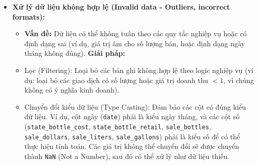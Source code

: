\begin{itemize}
\begin{itemize}
                \item \textbf{Giải pháp:}
                    \item Điền giá trị mặc định: Đối với các trường như địa chỉ, bạn có thể điền "Unknown" (Không xác định) thay vì để trống.
                    \item Xóa bỏ bản ghi: Nếu một số cột quan trọng (ví dụ: các cột liên quan đến doanh số như \texttt{state\_bottle\_cost}, \texttt{state\_bottle\_retail}, \texttt{sale\_bottles}, \texttt{sale\_dollars}, \texttt{sale\_liters}, \texttt{sale\_gallons}) bị thiếu, và việc điền dữ liệu không khả thi hoặc có thể làm sai lệch kết quả, chúng ta có thể xóa các bản ghi đó.
            \end{itemize}
        \item \textbf{Xử lý dữ liệu không hợp lệ (Invalid data - Outliers, incorrect formats):}
            \begin{itemize}
                \item \textbf{Vấn đề:} Dữ liệu có thể không tuân theo các quy tắc nghiệp vụ hoặc có định dạng sai (ví dụ, giá trị âm cho số lượng bán, hoặc định dạng ngày tháng không đúng).
                \textbf{Giải pháp:}
                    \item Lọc (Filtering): Loại bỏ các bản ghi không hợp lệ theo logic nghiệp vụ (ví dụ: loại bỏ các giao dịch có số lượng hoặc giá trị doanh thu $< 1$, vì chúng không có ý nghĩa kinh doanh).
                    \item Chuyển đổi kiểu dữ liệu (Type Casting): Đảm bảo các cột có đúng kiểu dữ liệu. Ví dụ, cột ngày (\texttt{date}) phải là kiểu ngày tháng, và các cột số (\texttt{state\_bottle\_cost}, \texttt{state\_bottle\_retail}, \texttt{sale\_bottles}, \texttt{sale\_dollars}, \texttt{sale\_liters}, \texttt{sale\_gallons}) phải là kiểu số để có thể thực hiện tính toán. Các giá trị không thể chuyển đổi sẽ được chuyển thành \texttt{NaN} (Not a Number), sau đó có thể xử lý như dữ liệu thiếu.
            \end{itemize}
    \end{itemize}


